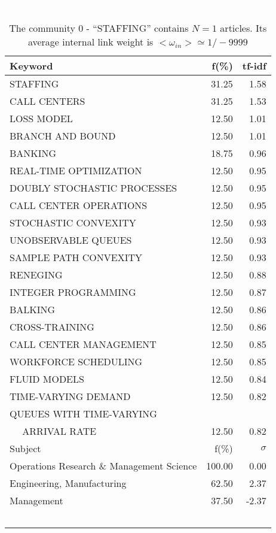 \documentclass[a4paper,11pt]{report}
\begin{document}
\begin{landscape}
\clearpage

\begin{table}[!ht]
\caption{The community 0 - ``STAFFING'' contains $N = 1$ articles. Its average internal link weight is $<\omega_{in}> \simeq 1/-9999$ }
\textcolor{white}{aa}\\
{\scriptsize\begin{tabular}{|l r  r|}
\hline
Keyword & f(\%) & tf-idf \\
\hline
STAFFING & 31.25 & 1.58\\
CALL CENTERS & 31.25 & 1.53\\
LOSS MODEL & 12.50 & 1.01\\
BRANCH AND BOUND & 12.50 & 1.01\\
BANKING & 18.75 & 0.96\\
REAL-TIME OPTIMIZATION & 12.50 & 0.95\\
DOUBLY STOCHASTIC PROCESSES & 12.50 & 0.95\\
CALL CENTER OPERATIONS & 12.50 & 0.95\\
STOCHASTIC CONVEXITY & 12.50 & 0.93\\
UNOBSERVABLE QUEUES & 12.50 & 0.93\\
SAMPLE PATH CONVEXITY & 12.50 & 0.93\\
RENEGING & 12.50 & 0.88\\
INTEGER PROGRAMMING & 12.50 & 0.87\\
BALKING & 12.50 & 0.86\\
CROSS-TRAINING & 12.50 & 0.86\\
CALL CENTER MANAGEMENT & 12.50 & 0.85\\
WORKFORCE SCHEDULING & 12.50 & 0.85\\
FLUID MODELS & 12.50 & 0.84\\
TIME-VARYING DEMAND & 12.50 & 0.82\\
QUEUES WITH TIME-VARYING &  &\\
$\quad$ ARRIVAL RATE & 12.50 & 0.82\\
\hline
\hline
Subject & f(\%) & $\sigma$\\
\hline
Operations Research \& Management Science & 100.00 & 0.00\\
Engineering, Manufacturing & 62.50 & 2.37\\
Management & 37.50 & -2.37\\
 &  & \\
 &  & \\
 &  & \\
 &  & \\
 &  & \\

\end{tabular}}
\end{table}
\end{landscape}
\end{document}
